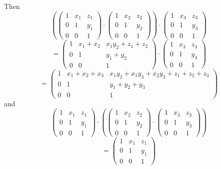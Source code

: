 \documentclass{article}
\newcommand{\chapternumber}{2}
\newenvironment{QandA}{\begin{enumerate}[label=\chapternumber.\arabic*]\bfseries\boldmath}
	{\end{enumerate}}
\newenvironment{answered}{\par\bigskip\normalfont\unboldmath}{}
\begin{document}
\begin{QandA}
\begin{answered}
\begin{itemize}
				Then 
				\[
				\left(
				\begin{pmatrix}
					1 & x_1 & z_1 \\ 0 & 1 & y_1 \\ 0 & 0 & 1
				\end{pmatrix}
				\cdot
				\begin{pmatrix}
					1 & x_2 & z_2 \\ 0 & 1 & y_2 \\ 0 & 0 & 1
				\end{pmatrix}
				\right)
				\cdot
				\begin{pmatrix}
					1 & x_3 & z_3 \\ 0 & 1 & y_3 \\ 0 & 0 & 1
				\end{pmatrix}
				\]
				\[=\begin{pmatrix}
					1 & x_1+x_2 & x_1y_2+z_1+z_2 \\ 0 & 1 & y_1+y_2 \\ 0 & 0 & 1
				\end{pmatrix}
				\cdot
				\begin{pmatrix}
					1 & x_3 & z_3 \\ 0 & 1 & y_3 \\ 0 & 0 & 1
				\end{pmatrix}
				\]
				\[=
				\begin{pmatrix}
					1 & x_1+x_2+x_3 & x_1y_2 + x_1y_3 + x_2y_3 + z_1+z_2+z_3 \\ 0 & 1 & y_1+y_2+y_3 \\ 0 & 0 & 1
				\end{pmatrix}\]
				and
				\[
				\begin{pmatrix}
					1 & x_1 & z_1 \\ 0 & 1 & y_1 \\ 0 & 0 & 1
				\end{pmatrix}
				\cdot
				\left(
				\begin{pmatrix}
					1 & x_2 & z_2 \\ 0 & 1 & y_2 \\ 0 & 0 & 1
				\end{pmatrix}
				\cdot
				\begin{pmatrix}
					1 & x_3 & z_3 \\ 0 & 1 & y_3 \\ 0 & 0 & 1
				\end{pmatrix}
				\right)
				\]
				\[=				\begin{pmatrix}
					1 & x_1 & z_1 \\ 0 & 1 & y_1 \\ 0 & 0 & 1

\end{pmatrix}\]
\end{itemize}
\end{answered}
\end{QandA}
\end{document}
